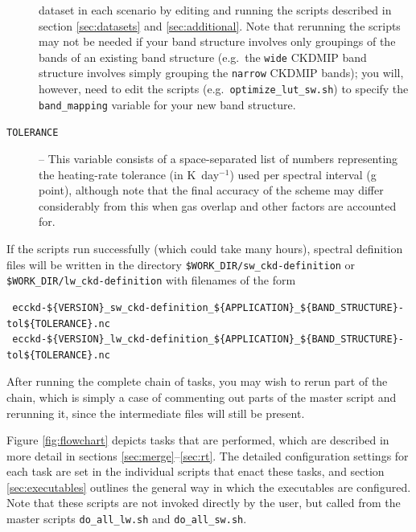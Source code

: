 \documentclass[a4,oneside]{article}
\def\codesize{\small}
\def\codesize{\small}
\def\code#1{{\codesize\texttt{#1}}}
\begin{document}
\begin{description}
  dataset in each scenario by editing and running the scripts
  described in section \ref{sec:datasets} and
  \ref{sec:additional}. Note that rerunning the scripts may not be
  needed if your band structure involves only groupings of the bands
  of an existing band structure (e.g.\ the \code{wide} CKDMIP band
  structure involves simply grouping the \code{narrow} CKDMIP bands);
  you will, however, need to edit the scripts
  (e.g.\ \code{optimize\_lut\_sw.sh}) to specify the
  \code{band\_mapping} variable for your new band structure.
\item[\code{TOLERANCE}] -- This variable consists of a space-separated
  list of numbers representing the heating-rate tolerance (in
  K~day$^{-1}$) used per spectral interval (g point), although note
  that the final accuracy of the scheme may differ considerably from
  this when gas overlap and other factors are accounted for.
\end{description}
If the scripts run successfully (which could take many hours),
spectral definition files will be written in the directory
\code{\$WORK\_DIR/sw\_ckd-definition} or
\code{\$WORK\_DIR/lw\_ckd-definition} with filenames of the form
\begin{lstlisting}
 ecckd-${VERSION}_sw_ckd-definition_${APPLICATION}_${BAND_STRUCTURE}-tol${TOLERANCE}.nc
 ecckd-${VERSION}_lw_ckd-definition_${APPLICATION}_${BAND_STRUCTURE}-tol${TOLERANCE}.nc
\end{lstlisting}
After running the complete chain of tasks, you may wish to rerun part
of the chain, which is simply a case of commenting out parts of the
master script and rerunning it, since the intermediate files will
still be present.

Figure \ref{fig:flowchart} depicts tasks that are performed, which are
described in more detail in sections
\ref{sec:merge}--\ref{sec:rt}. The detailed configuration settings for
each task are set in the individual scripts that enact these tasks,
and section \ref{sec:executables} outlines the general way in which
the executables are configured.  Note that these scripts are not
invoked directly by the user, but called from the master scripts
\code{do\_all\_lw.sh} and \code{do\_all\_sw.sh}.
\end{document}
